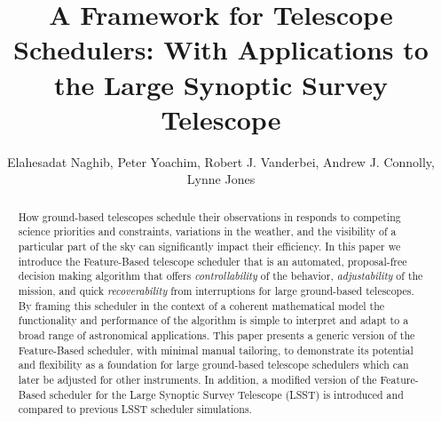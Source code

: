 \documentclass[12pt]{aastex62}
\theoremstyle{definition}
\begin{document}
\title{A Framework for Telescope Schedulers: With Applications to the Large Synoptic Survey Telescope}
\author{Elahesadat Naghib, Peter Yoachim, Robert J. Vanderbei, Andrew J. Connolly, Lynne Jones}


\begin{abstract}
How ground-based telescopes schedule their observations in responds to competing science priorities and constraints, variations in the weather, and the visibility of a particular part of the sky can significantly impact their efficiency. In this paper we introduce the Feature-Based telescope scheduler that is an automated, proposal-free decision making algorithm that offers \textit{controllability} of the behavior, \textit{adjustability} of the mission, and quick \textit{recoverability} from interruptions for large ground-based telescopes. By framing this scheduler in the context of a coherent mathematical model the functionality and performance of the algorithm is simple to interpret and adapt to a broad range of astronomical applications. This paper presents a generic version of the Feature-Based scheduler, with minimal manual tailoring, to demonstrate its potential and flexibility as a foundation for large ground-based telescope schedulers which can later be adjusted for other instruments. In addition, a modified version of the Feature-Based scheduler for the Large Synoptic Survey Telescope (LSST) is introduced and compared to previous LSST scheduler simulations.
\end{abstract}
\end{document}
